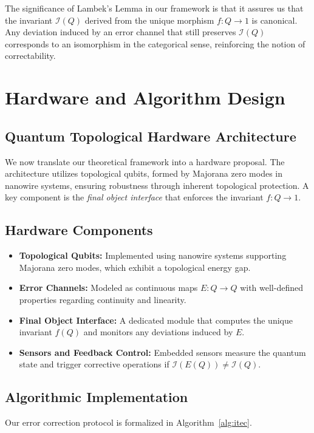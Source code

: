 \documentclass[11pt]{article}
\begin{document}
The significance of Lambek’s Lemma in our framework is that it assures us that the invariant \(\mathcal{I}(Q)\) derived from the unique morphism \(f: Q \to 1\) is canonical. Any deviation induced by an error channel that still preserves \(\mathcal{I}(Q)\) corresponds to an isomorphism in the categorical sense, reinforcing the notion of correctability.

\section{Hardware and Algorithm Design}
\label{sec:hardware}
\subsection{Quantum Topological Hardware Architecture}
We now translate our theoretical framework into a hardware proposal. The architecture utilizes topological qubits, formed by Majorana zero modes in nanowire systems, ensuring robustness through inherent topological protection. A key component is the \emph{final object interface} that enforces the invariant \(f: Q\to 1\).

\subsection{Hardware Components}
\begin{itemize}[leftmargin=2cm]
    \item \textbf{Topological Qubits:} Implemented using nanowire systems supporting Majorana zero modes, which exhibit a topological energy gap.
    \item \textbf{Error Channels:} Modeled as continuous maps \(E: Q\to Q\) with well-defined properties regarding continuity and linearity.
    \item \textbf{Final Object Interface:} A dedicated module that computes the unique invariant \(f(Q)\) and monitors any deviations induced by \(E\).
    \item \textbf{Sensors and Feedback Control:} Embedded sensors measure the quantum state and trigger corrective operations if \(\mathcal{I}(E(Q)) \neq \mathcal{I}(Q)\).
\end{itemize}

\subsection{Algorithmic Implementation}
Our error correction protocol is formalized in Algorithm~\ref{alg:itec}.
\end{document}
